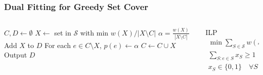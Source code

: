 \documentclass[12pt,aspectratio=169]{beamer}
\begin{document}
\begin{frame}\frametitle{Dual Fitting for Greedy Set Cover }
\begin{columns} 
  \begin{column}{0.55\textwidth}
\begin{algorithm}[H]
  $C, D\gets \emptyset$\;
%
{
  $X\gets$ set in $\mathcal{S}$ with min $w(X)/|X\setminus C|$\;
  $\alpha = \frac{w(X)}{|X\setminus C|}$\;
  Add $X$ to $D$\;
  For each $e\in C\setminus X$, $p(e)\gets \alpha$\;
  $C\gets C\cup X$
}
Output $D$
\end{algorithm}
\end{column}
  \begin{column}{0.41\textwidth}
  \begin{block}{ILP}
    \begin{equation}
    \begin{split}
      \min \sum_{S\in \mathcal{S}} w(S) \qquad\text{subject to}\\
      \sum_{S: e\in S} x_{S}\ge 1\quad \forall e\in U\\
      x_{S}\in \{0,1\}\quad \forall S\in \mathcal{S}
     \end{split}
   \end{equation}
 \end{block}
\end{column}
\end{columns}
\end{frame}
\end{document}
